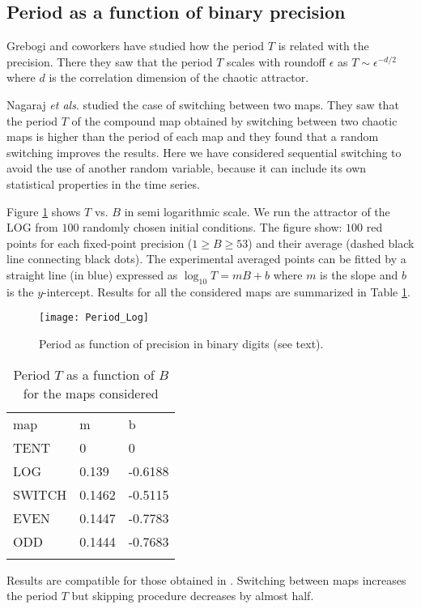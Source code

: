 \subsection{Period as a function of binary precision}

Grebogi and coworkers \cite{Grebogi1988} have studied how the period $T$ is related with the precision.
There they saw that the period $T$ scales with roundoff $\epsilon$ as $T\sim\epsilon^{-d/2}$ where $d$ is the correlation dimension of the chaotic attractor.

Nagaraj \textit{et als}. \cite{Nagaraj2008} studied the case of switching between two maps.
They saw that the period $T$ of the compound map obtained by switching between two chaotic maps is higher than the period of each map and they found that a random switching improves the results.
Here we have considered sequential switching to avoid the use of another random variable, because it can include its own statistical properties in the time series.

Figure \ref{fig:period} shows  $T$ vs. $B$ in semi logarithmic scale.
We run the attractor of the LOG from $100$ randomly chosen initial conditions.
The figure show: $100$ red points for each fixed-point precision ($1\geq B \geq 53$) and their average (dashed black line connecting black dots).
The experimental averaged points can be fitted by a straight line (in blue) expressed as $\log_{10}T=m B + b$ where $m$ is the slope and $b$ is the $y$-intercept.
Results for all the considered maps are summarized in Table \ref{tabla:periodos}.
%
\begin{figure}[H]
\centering	
	\texttt{[image: Period\_Log]}
	\caption{Period as function of precision in binary digits (see text).}
	\label{fig:period}
\end{figure}
%
\begin{table}[H]
\centering	
	\caption{Period $T$ as a function of $B$ for the maps considered}
	\vspace{1em}
	\begin{tabular}{lll}
		\hline\noalign{\smallskip}
		map 	& m 	& b  \\
		\noalign{\smallskip}\hline\noalign{\smallskip}
		TENT	&0 		& 0 \\
		LOG 	&0.139 	& -0.6188 \\
		SWITCH 	&0.1462 & -0.5115 \\
		EVEN 	&0.1447 & -0.7783 \\
		ODD 	&0.1444 & -0.7683 \\
		\noalign{\smallskip}\hline
	\end{tabular}
	\label{tabla:periodos}	
\end{table}

Results are compatible for those obtained in \cite{Nagaraj2008}.
Switching between maps increases the period $T$ but skipping procedure decreases by almost half.